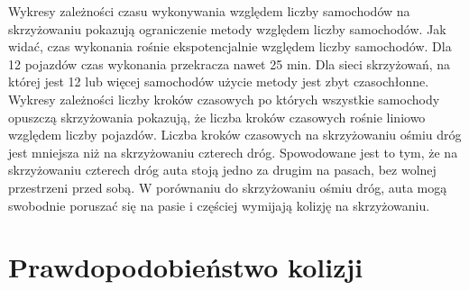 Wykresy zależności czasu wykonywania względem liczby samochodów na skrzyżowaniu pokazują ograniczenie metody względem liczby samochodów. Jak widać, czas wykonania rośnie ekspotencjalnie względem liczby samochodów. Dla 12 pojazdów czas wykonania przekracza nawet 25 min. Dla sieci skrzyżowań, na której jest 12 lub więcej samochodów użycie metody jest zbyt czasochłonne.
\newline
\indent
Wykresy zależności liczby kroków czasowych po których wszystkie samochody opuszczą skrzyżowania pokazują, że liczba kroków czasowych rośnie liniowo względem liczby pojazdów. 
\newline
\indent
Liczba kroków czasowych na skrzyżowaniu ośmiu dróg jest mniejsza niż na skrzyżowaniu czterech dróg. Spowodowane jest to tym, że na skrzyżowaniu czterech dróg auta stoją jedno za drugim na pasach, bez wolnej przestrzeni przed sobą. W porównaniu do skrzyżowaniu ośmiu dróg, auta mogą swobodnie poruszać się na pasie i częściej wymijają kolizję na skrzyżowaniu.

\section{Prawdopodobieństwo kolizji}

